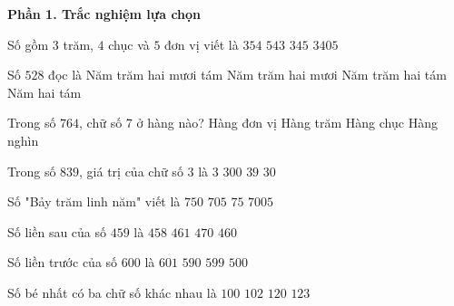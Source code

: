 \textbf{Phần 1. Trắc nghiệm lựa chọn}

\begin{ex} %
Số gồm $3$ trăm, $4$ chục và $5$ đơn vị viết là
\choice
{$354$}
{$543$}
{\True $345$}
{$3405$}
\end{ex}

\begin{ex} %
Số $528$ đọc là
\choice
{\True Năm trăm hai mươi tám}
{Năm trăm hai mươi}
{Năm trăm hai tám}
{Năm hai tám}
\end{ex}

\begin{ex} %
Trong số $764$, chữ số 7 ở hàng nào?
\choice
{Hàng đơn vị}
{\True Hàng trăm}
{Hàng chục}
{Hàng nghìn}
\end{ex}

\begin{ex} %
Trong số $839$, giá trị của chữ số 3 là
\choice
{$3$}
{$300$}
{$39$}
{\True $30$}
\end{ex}

\begin{ex} %
Số "Bảy trăm linh năm" viết là
\choice
{$750$}
{\True $705$}
{$75$}
{$7005$}
\end{ex}

\begin{ex} %
Số liền sau của số $459$ là
\choice
{$458$}
{$461$}
{$470$}
{\True $460$}
\end{ex}

\begin{ex} %
Số liền trước của số $600$ là
\choice
{$601$}
{$590$}
{\True $599$}
{$500$}
\end{ex}

\begin{ex} %
Số bé nhất có ba chữ số khác nhau là
\choice
{$100$}
{\True $102$}
{$120$}
{$123$}
\end{ex}

